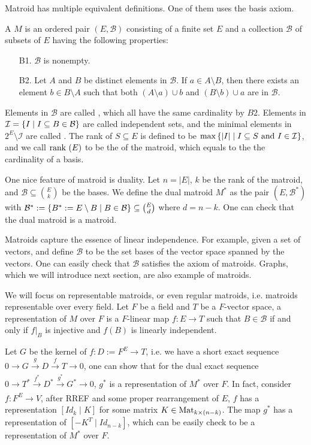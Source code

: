 \documentclass[b5paper]{article}
\newcommand{\II}{\mathcal{I}}
\newcommand{\BB}{\mathcal{B}}
\newcommand{\del}{\setminus}
\begin{document}
Matroid has multiple equivalent definitions. One of them uses the basis axiom. 
\begin{definition}[def:]{}
  A  $M$ is an ordered pair $(E,\BB)$ consisting of a finite set $E$ and a collection $\BB$ of subsets of $E$ having the following properties:
  \begin{enumerate}
    \item [B1.] $\BB$ is nonempty.
    \item [B2.] Let $A$ and $B$ be distinct elements in $\BB$. If $a\in A\del B$, then there exists an element $b\in B\del A$ such that both $(A\del a)\cup b$ and $(B\del b)\cup a$ are in $\BB$.
  \end{enumerate}
\end{definition}
Elements in $\BB$ are called , which all have the same cardinality by $B2$. Elements in $\II=\CB{I\mid I\subseteq B\in \BB}$ are called independent sets, and the minimal elements in $2^E\del \II$ are called . The rank of $S\subseteq E$ is defined to be $\max\CB{|I|\mid I\subseteq S\textnormal{ and }I\in \II}$, and we call $\textnormal{rank }(E)$ to be the  of the matroid, which equals to the the cardinality of a basis. 

One nice feature of matroid is duality. Let $n=|E|$, $k$ be the rank of the matroid, and $\BB\subseteq \binom{E}{k}$ be the bases. We define the dual matroid $M^*$ as the pair $(E,\BB^*)$ with $\BB^*:=\CB{B^*:=E\del B\mid B\in \BB}\subseteq \binom{E}{d}$ where $d=n-k$. One can check that the dual matroid is a matroid.

Matroids capture the essence of linear independence. For example, given a set of vectors, and define $\BB$ to be the set bases of the vector space spanned by the vectors. One can easily check that $\BB$ satisfies the axiom of matroids. Graphs, which we will introduce next section, are also example of matroids.

We will focus on representable matroids, or even regular matroids, i.e. matroids representable over every field.
Let $F$ be a field and $T$ be a $F$-vector space, a representation of $M$ over $F$ is a $F$-linear map $f:E\rightarrow T$ such that $B\in \BB$ if and only if $f|_B$ is injective and $f(B)$ is linearly independent.

Let $G$ be the kernel of $f:D:=F^E\rightarrow T$, i.e. we have a short exact sequence $0\rightarrow G\xrightarrow[]{g} D\xrightarrow[]{f} T\rightarrow 0$, one can show that for the dual exact sequence $0\rightarrow T^*\xrightarrow[]{f^*}D^*\xrightarrow[]{g^*}G^*\rightarrow 0$, $g^*$ is a representation of $M^*$ over $F$.
In fact, consider $f:F^E\rightarrow V$, after RREF and some proper rearrangement of $E$, $f$ has a representation $[Id_k\mid K]$ for some matrix $K\in \textnormal{Mat}_{k\times (n-k)}$. The map $g^*$ has a representation of $[-K^T\mid Id_{n-k}]$, which can be easily check to be a representation of $M^*$ over $F$.
\end{document}
